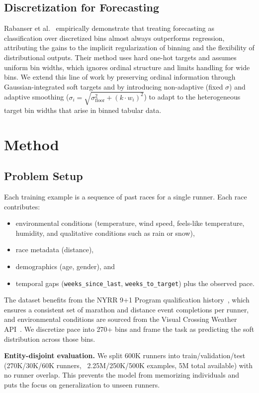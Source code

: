 \documentclass{article}
\begin{document}
\subsection{Discretization for Forecasting}
Rabanser et al.~\cite{rabanser2020discretization} empirically demonstrate that treating forecasting as classification over discretized bins almost always outperforms regression, attributing the gains to the implicit regularization of binning and the flexibility of distributional outputs. Their method uses hard one-hot targets and assumes uniform bin widths, which ignores ordinal structure and limits handling for wide bins. We extend this line of work by preserving ordinal information through Gaussian-integrated soft targets and by introducing non-adaptive (fixed \(\sigma\)) and adaptive smoothing (\(\sigma_i = \sqrt{\sigma_{\text{floor}}^2 + (k \cdot w_i)^2}\)) to adapt to the heterogeneous target bin widths that arise in binned tabular data.
\section{Method}
\subsection{Problem Setup}
Each training example is a sequence of past races for a single runner. Each race contributes:
\begin{itemize}
  \item environmental conditions (temperature, wind speed, feels-like temperature, humidity, and qualitative conditions such as rain or snow),
  \item race metadata (distance),
  \item demographics (age, gender), and
  \item temporal gaps (\texttt{weeks\_since\_last}, \texttt{weeks\_to\_target}) plus the observed pace.
\end{itemize}
The dataset benefits from the NYRR 9+1 Program qualification history~\cite{nyrr2024}, which ensures a consistent set of marathon and distance event completions per runner, and environmental conditions are sourced from the Visual Crossing Weather API~\cite{visualcrossing2024}.
We discretize pace into 270+ bins and frame the task as predicting the soft distribution across those bins.

\textbf{Entity-disjoint evaluation.} We split 600K runners into train/validation/test (270K/30K/60K runners, ~2.25M/250K/500K examples, 5M total available) with no runner overlap. This prevents the model from memorizing individuals and puts the focus on generalization to unseen runners.
\end{document}
